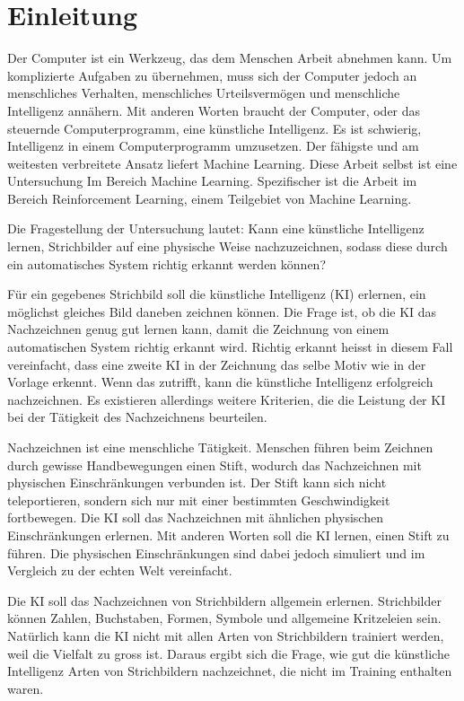 \chapter{Einleitung}\label{chap:einleit}
Der Computer ist ein Werkzeug, das dem Menschen Arbeit abnehmen kann. Um
komplizierte Aufgaben zu übernehmen, muss sich der Computer jedoch an
menschliches Verhalten, menschliches Urteilsvermögen und menschliche Intelligenz
annähern. Mit anderen Worten braucht der Computer, oder das steuernde
Computerprogramm, eine künstliche Intelligenz. Es ist schwierig, Intelligenz in
einem Computerprogramm umzusetzen. Der fähigste und am weitesten verbreitete
Ansatz liefert Machine Learning. Diese Arbeit selbst ist eine Untersuchung Im
Bereich Machine Learning. Spezifischer ist die Arbeit im Bereich Reinforcement
Learning, einem Teilgebiet von Machine Learning.

Die Fragestellung der Untersuchung lautet: Kann eine künstliche Intelligenz
lernen, Strichbilder auf eine physische Weise nachzuzeichnen, sodass diese durch
ein automatisches System richtig erkannt werden können?

Für ein gegebenes Strichbild soll die künstliche Intelligenz (KI) erlernen, ein
möglichst gleiches Bild daneben zeichnen können. Die Frage ist, ob die KI das
Nachzeichnen genug gut lernen kann, damit die Zeichnung von einem automatischen
System richtig erkannt wird. Richtig erkannt heisst in diesem Fall vereinfacht,
dass eine zweite KI in der Zeichnung das selbe Motiv wie in der Vorlage erkennt.
Wenn das zutrifft, kann die künstliche Intelligenz erfolgreich nachzeichnen. Es
existieren allerdings weitere Kriterien, die die Leistung der KI bei der
Tätigkeit des Nachzeichnens beurteilen.

Nachzeichnen ist eine menschliche Tätigkeit. Menschen führen beim Zeichnen durch
gewisse Handbewegungen einen Stift, wodurch das Nachzeichnen mit physischen
Einschränkungen verbunden ist. Der Stift kann sich nicht teleportieren, sondern
sich nur mit einer bestimmten Geschwindigkeit fortbewegen. Die KI soll das
Nachzeichnen mit ähnlichen physischen Einschränkungen erlernen. Mit anderen
Worten soll die KI lernen, einen Stift zu führen.  Die
physischen Einschränkungen sind dabei jedoch simuliert und im Vergleich zu der
echten Welt vereinfacht. 

Die KI soll das Nachzeichnen von Strichbildern allgemein erlernen. Strichbilder
können Zahlen, Buchstaben, Formen, Symbole und allgemeine Kritzeleien sein.
Natürlich kann die KI nicht mit allen Arten von Strichbildern trainiert werden,
weil die Vielfalt zu gross ist. Daraus ergibt sich die Frage, wie gut die
künstliche Intelligenz Arten von Strichbildern nachzeichnet, die nicht im
Training enthalten waren.

